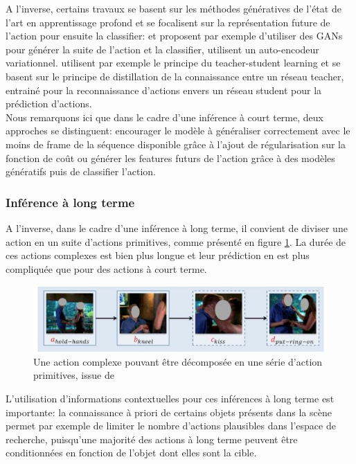 A l'inverse, certains travaux se basent sur les méthodes génératives de l'état de l'art en apprentissage profond et se focalisent sur la représentation future de l'action pour ensuite la classifier:
\cite{2019arXiv191207148G} et \cite{xu2019prediction} proposent par exemple d'utiliser des GANs pour générer la suite de l'action et la classifier,\cite{runsheng2017predictive} utilisent un auto-encodeur variationnel. 
\cite{wang2019progressive} utilisent par exemple le principe du teacher-student learning et se basent sur le principe de distillation de la connaissance entre un réseau teacher, entrainé pour la reconnaissance d'actions envers un réseau student pour la prédiction d'actions.\\

Nous remarquons ici que dans le cadre d'une inférence à court terme, deux approches se distinguent: encourager le modèle à généraliser correctement avec le moins de frame de la séquence disponible grâce à l'ajout de régularisation sur la fonction de coût ou générer les features futurs de l'action grâce à des modèles génératifs puis de classifier l'action.


\subsubsection{Inférence à long terme}
A l'inverse, dans le cadre d'une inférence à long terme, il convient de diviser une action en un suite d'actions primitives, comme présenté en figure \ref{fig:47}.
La durée de ces actions complexes est bien plus longue et leur prédiction en est plus compliquée que pour des actions à court terme.
\begin{figure}[H]
    \centering
    \includegraphics[width=0.7\linewidth]{Images/47.png}
    \caption{Une action complexe pouvant être décomposée en une série d'action primitives, issue de \cite{li2014prediction}}
    \label{fig:47}
\end{figure}

 L'utilisation d'informations contextuelles pour ces inférences à long terme est importante: la connaissance à priori de certains objets présents dans la scène permet par exemple de limiter le nombre d'actions plausibles dans l'espace de recherche, puisqu'une majorité des actions à long terme peuvent être conditionnées en fonction de l'objet dont elles sont la cible.\\
 
